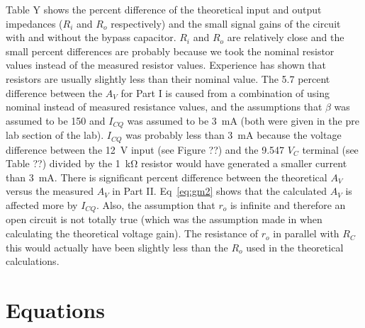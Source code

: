 Table Y shows the percent difference of the theoretical input and output impedances ($R_i$ and $R_o$ respectively) and the small signal gains of the circuit with and without the bypass capacitor. $R_i$ and $R_o$ are relatively close and the small percent differences are probably because we took the nominal resistor values instead of the measured resistor values. Experience has shown that resistors are usually slightly less than their nominal value. The 5.7 percent difference between the $A_V$ for Part I is caused from a combination of using nominal instead of measured resistance values, and the assumptions that $\beta$ was assumed to be 150 and  $I_{CQ}$ was assumed to be \SI{3}{mA} (both were given in the pre lab section of the lab). $I_{CQ}$ was probably less than \SI{3}{mA} because the voltage difference between the \SI{12}{V} input (see Figure ??) and the 9.547 $V_C$ terminal (see Table ??) divided by the \SI{1}{\kilo\ohm} resistor would have generated a smaller current than \SI{3}{mA}. There is significant percent difference between the theoretical $A_V$ versus the measured $A_V$ in Part II. Eq~\ref{eq:gm2} shows that the calculated $A_V$ is affected more by $I_{CQ}$. Also, the assumption that $r_o$ is infinite and therefore an open circuit is not totally true (which was the assumption made in when calculating the theoretical voltage gain). The resistance of $r_o$ in parallel with $R_C$ this would actually have been slightly less than the $R_o$ used in the theoretical calculations.


\section{Equations}


